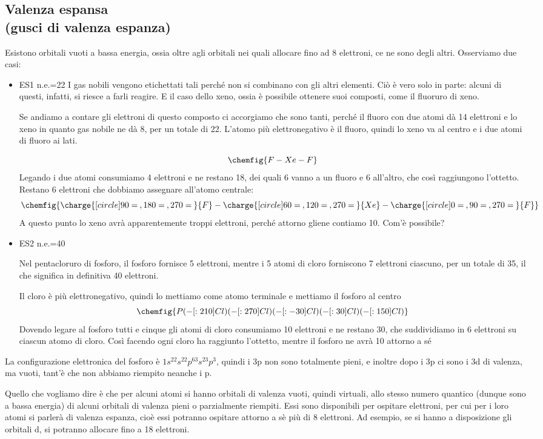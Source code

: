 \subsection{Valenza espansa \\{\small (gusci di valenza espanza)}}
Esistono orbitali vuoti a bassa energia, ossia oltre agli orbitali nei quali allocare fino ad 8 elettroni, ce ne sono degli altri. Osserviamo due casi:
\begin{itemize}
    \item ES1  n.e.=22
    I gas nobili vengono etichettati tali perché non si combinano con gli altri elementi. Ciò è vero solo in parte: alcuni di questi, infatti, si riesce a farli reagire. E il caso dello xeno, ossia è possibile ottenere suoi composti, come il fluoruro di xeno.

    Se andiamo a contare gli elettroni di questo composto ci accorgiamo che sono tanti, perché il fluoro con due atomi dà 14 elettroni e lo xeno in quanto gas nobile ne dà 8, per un totale di 22. L'atomo più elettronegativo è il fluoro, quindi lo xeno va al centro e i due atomi di fluoro ai lati. 
 
    $$
    \chemfig{F-Xe-F}
    $$
    Legando i due atomi consumiamo 4 elettroni e ne restano 18, dei quali 6 vanno a un fluoro e 6 all'altro, che così raggiungono l'ottetto. Restano 6 elettroni che dobbiamo assegnare all'atomo centrale:
    $$
    \chemfig{\charge{[circle]90=\:,180=\:,270=\:}{F}-\charge{[circle]60=\:,120=\:,270=\:}{Xe}-\charge{[circle]0=\:,90=\:,270=\:}{F}}
    $$
    A questo punto lo xeno avrà apparentemente troppi elettroni, perché attorno gliene contiamo 10. Com'è possibile?
    \item ES2  n.e.=40
    
    Nel pentacloruro di fosforo, il fosforo fornisce 5 elettroni, mentre i 5 atomi di cloro forniscono 7 elettroni ciascuno, per un totale di 35, il che significa in definitiva 40 elettroni.

    Il cloro è più elettronegativo, quindi lo mettiamo come atomo terminale e mettiamo il fosforo al centro
    $$
    \chemfig{P(-[:210]Cl)(-[:270]Cl)(-[:-30]Cl)(-[:30]Cl)(-[:150]Cl)}
    $$
    Dovendo legare al fosforo tutti e cinque gli atomi di cloro consumiamo 10 elettroni e ne restano 30, che suddividiamo in 6 elettroni su ciascun atomo di cloro. Così facendo ogni cloro ha raggiunto l'ottetto, mentre il fosforo ne avrà 10 attorno a sé
\end{itemize}
La configurazione elettronica del fosforo è $1s^22s^22p^63s^23p^3$, quindi i 3p non sono totalmente pieni, e inoltre dopo i 3p ci sono i 3d di valenza, ma vuoti, tant'è che non abbiamo riempito neanche i p.

Quello che vogliamo dire è che per alcuni atomi si hanno orbitali di valenza vuoti, quindi virtuali, allo stesso numero quantico (dunque sono a bassa energia) di alcuni orbitali di valenza pieni o parzialmente riempiti. Essi sono disponibili per ospitare elettroni, per cui per i loro atomi si parlerà di valenza espanza, cioè essi potranno ospitare attorno a sè più di 8 elettroni. Ad esempio, se si hanno a disposizione gli orbitali d, si potranno allocare fino a 18 elettroni.